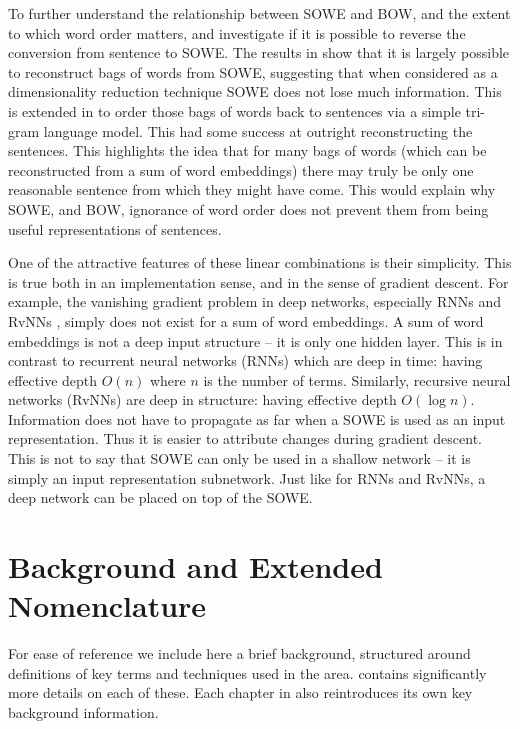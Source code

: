 \documentclass{book}
\begin{document}
To further understand the relationship between SOWE and BOW, and the extent to which word order matters,  and  investigate if it is possible to reverse the conversion from sentence to SOWE.
The results in  show that it is largely possible to reconstruct bags of words from SOWE, suggesting that when considered as a dimensionality reduction technique SOWE does not lose much information.
This is extended in  to order those bags of words back to sentences via a simple tri-gram language model.
This had some success at outright reconstructing the sentences.
This highlights the idea that for many  bags of words (which can be reconstructed from a sum of word embeddings) there may truly be only one reasonable sentence from which they might have come.
This would explain why SOWE, and BOW, ignorance of word order does not prevent them from being useful representations of sentences.


One of the attractive features of these linear combinations is their simplicity.
This is true both in an implementation sense, and in the sense of gradient descent.
For example, the vanishing gradient problem in deep networks, especially RNNs \citep{bengio1994learning}  and RvNNs \citep{socher2014recursive},
simply does not exist for a sum of word embeddings.
A sum of word embeddings is not a deep input structure -- it is only one hidden layer.
This is in contrast to recurrent neural networks (RNNs) which are deep in time: having effective depth $O(n)$ where $n$ is the number of terms.
Similarly, recursive neural networks (RvNNs) are deep in structure: having effective depth $O(\log n)$.
Information does not have to propagate as far when a SOWE is used as an input representation.
Thus it is easier to attribute changes during gradient descent.
This is not to say that SOWE can only be used in a shallow network -- it is simply an input representation subnetwork.
Just like for RNNs and RvNNs, a deep network can be placed on top of the SOWE.



\section{Background and Extended Nomenclature}
For ease of reference we include here a brief background,
structured around definitions of key terms and techniques used in the area.
 contains significantly more details on each of these.
Each chapter in  also reintroduces its own key background information.
\end{document}
